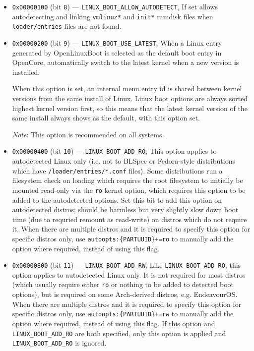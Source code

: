 \documentclass[]{article}
\begin{document}
\begin{itemize}
\begin{itemize}
    \item \texttt{0x00000100} (bit \texttt{8}) --- \texttt{LINUX\_BOOT\_ALLOW\_AUTODETECT},
    If set allows autodetecting and linking \texttt{vmlinuz*} and \texttt{init*} ramdisk files
    when \texttt{loader/entries} files are not found.
    \item \texttt{0x00000200} (bit \texttt{9}) --- \texttt{LINUX\_BOOT\_USE\_LATEST},
    When a Linux entry generated by OpenLinuxBoot is selected as the default boot entry
    in OpenCore, automatically switch to the latest kernel when a new version is installed. \medskip

    When this option is set, an internal menu entry id is shared between kernel versions from the same install
    of Linux. Linux boot options are always sorted highest kernel version first, so this means that
    the latest kernel version of the same install always shows as the default, with this option set. \medskip

    \emph{Note}: This option is recommended on all systems. \medskip

    \item \texttt{0x00000400} (bit \texttt{10}) --- \texttt{LINUX\_BOOT\_ADD\_RO},
    This option applies to autodetected Linux only (i.e. not to BLSpec or
    Fedora-style distributions which have \texttt{/loader/entries/*.conf} files).
    Some distributions run a filesystem check on loading which requires the root
    filesystem to initially be mounted read-only via the \texttt{ro} kernel option, which requires this
    option to be added to the autodetected options. Set this bit to add this
    option on autodetected distros; should be harmless but very slightly slow down boot time (due to requried
    remount as read-write) on distros which do not require it.
    When there are multiple distros and it is required to specify this option for specific distros only, use
    \texttt{autoopts:\{PARTUUID\}+=ro} to manually add the option where required, instead of using this flag.

    \item \texttt{0x00000800} (bit \texttt{11}) --- \texttt{LINUX\_BOOT\_ADD\_RW},
    Like \texttt{LINUX\_BOOT\_ADD\_RO}, this option applies to autodetected Linux only. It is not
    required for most distros (which usually require either \texttt{ro} or nothing to be added to
    detected boot options), but is required on some Arch-derived distros, e.g. EndeavourOS.
    When there are multiple distros and it is required to specify this option for specific distros only, use
    \texttt{autoopts:\{PARTUUID\}+=rw} to manually add the option where required, instead of using this flag.
    If this option and \texttt{LINUX\_BOOT\_ADD\_RO} are both specified, only this option is applied
    and \texttt{LINUX\_BOOT\_ADD\_RO} is ignored.


\end{itemize}
\end{itemize}
\end{document}

